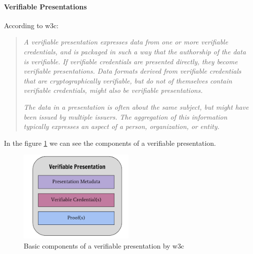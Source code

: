 \paragraph{Verifiable Presentations}
According to \acrshort{w3c}\cite{w3c-vc}:
\begin{quote}
    \textit{A verifiable presentation expresses data from one or more verifiable credentials, and is packaged in such a way that the authorship of the data is verifiable. If verifiable credentials are presented directly, they become verifiable presentations. Data formats derived from verifiable credentials that are cryptographically verifiable, but do not of themselves contain verifiable credentials, might also be verifiable presentations.}

    \textit{The data in a presentation is often about the same subject, but might have been issued by multiple issuers. The aggregation of this information typically expresses an aspect of a person, organization, or entity.}
\end{quote}
In the figure \ref{fig:ssi-vp} we can see the components of a verifiable presentation.
\begin{figure}[ht]
    \centering
    \includegraphics[width=0.5\textwidth]{images/State of the Art/ssi/ssi-vp.png}
    \caption{Basic components of a verifiable presentation by \acrshort{w3c}}
    \label{fig:ssi-vp}
\end{figure}

